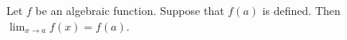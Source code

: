\begin{frame}
\begin{theorem}
Let $f$ be an algebraic function. Suppose that $f(a)$ is defined. Then $\displaystyle \lim_{x\to a}f(x) = f(a)$.
\end{theorem}
\end{frame}
